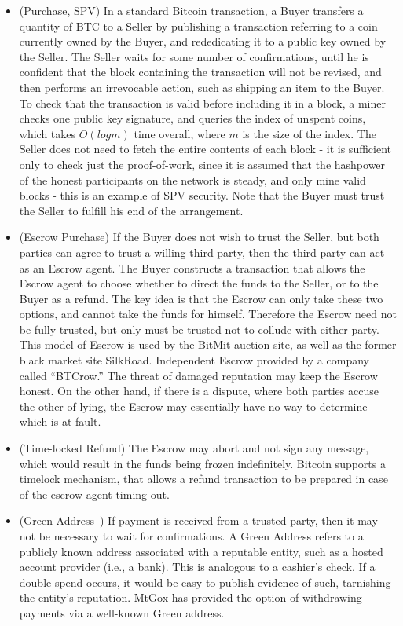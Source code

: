 \begin{itemize}
\item (Purchase, SPV) In a standard Bitcoin transaction, a Buyer transfers a quantity of BTC to a Seller by publishing a transaction referring to a coin currently owned by the Buyer, and rededicating it to a public key owned by the Seller. The Seller waits for some number of confirmations, until he is confident that the block containing the transaction will not be revised, and then performs an irrevocable action, such as shipping an item to the Buyer. To check that the transaction is valid before including it in a block, a miner checks one public key signature, and queries the index of unspent coins, which takes $O(log m)$ time overall, where $m$ is the size of the index. The Seller does not need to fetch the entire contents of each block - it is sufficient only to check just the proof-of-work, since it is assumed that the hashpower of the honest participants on the network is steady, and only mine valid blocks - this is an example of SPV security. Note that the Buyer must trust the Seller to fulfill his end of the arrangement.

\item (Escrow Purchase) If the Buyer does not wish to trust the Seller, but both parties can agree to trust a willing third party, then the third party can act as an Escrow agent. The Buyer constructs a transaction that allows the Escrow agent to choose whether to direct the funds to the Seller, or to the Buyer as a refund. The key idea is that the Escrow can only take these two options, and cannot take the funds for himself. Therefore the Escrow need not be fully trusted, but only must be trusted not to collude with either party. This model of Escrow is used by the BitMit auction site, as well as the former black market site SilkRoad. Independent Escrow provided by a company called ``BTCrow.'' The threat of damaged reputation may keep the Escrow honest. On the other hand, if there is a dispute, where both parties accuse the other of lying, the Escrow may essentially have no way to determine which is at fault.

\item (Time-locked Refund) The Escrow may abort and not sign any message, which would result in the funds being frozen indefinitely. Bitcoin supports a timelock mechanism, that allows a refund transaction to be prepared in case of the escrow agent timing out.
\item (Green Address~\cite{greenaddress}) If payment is received from a trusted party, then it may not be necessary to wait for confirmations. A Green Address refers to a publicly known address associated with a reputable entity, such as a hosted account provider (i.e., a bank). This is analogous to a cashier's check. If a double spend occurs, it would be easy to publish evidence of such, tarnishing the entity's reputation. MtGox has provided the option of withdrawing payments via a well-known Green address.


\end{itemize}

